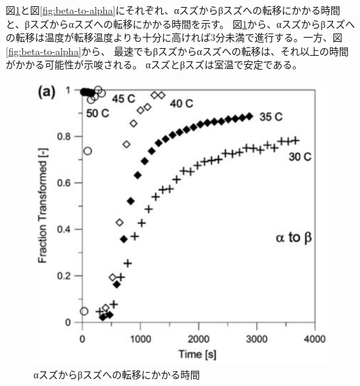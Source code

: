 図\ref{fig:alpha-to-beta}と図\ref{fig:beta-to-alpha}にそれぞれ、αスズからβスズへの転移にかかる時間と、βスズからαスズへの転移にかかる時間を示す\cite{Nogita}。
図\ref{fig:alpha-to-beta}から、αスズからβスズへの転移は温度が転移温度よりも十分に高ければ3分未満で進行する。一方、図\ref{fig:beta-to-alpha}から、
最速でもβスズからαスズへの転移は、それ以上の時間がかかる可能性が示唆される。
αスズとβスズは室温で安定である。
\begin{figure}[!h]
 \begin{minipage}{0.5\hsize}
  \begin{center}
   \includegraphics[width=\hsize]{Introduction/alpha-to-beta.eps}
  \end{center}
  \caption{αスズからβスズへの転移にかかる時間}
  \label{fig:alpha-to-beta}
 \end{minipage}
 \begin{minipage}{0.5\hsize}
    \begin{center}

\end{center}
\end{minipage}
\end{figure}
